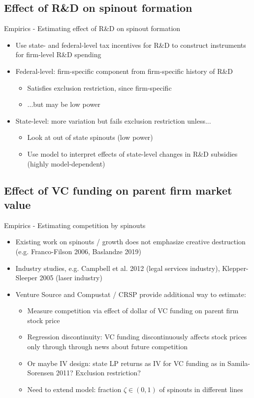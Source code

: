 \documentclass[english,usenames,dvipsnames]{beamer}
\begin{document}
\subsection{Effect of R\&D on spinout formation}

\begin{frame}{Empirics - Estimating effect of R\&D on spinout formation}
\begin{itemize}
	\item Use \alert{state- and federal-level tax incentives for R\&D} to construct \alert{instruments for firm-level R\&D spending}
	\item Federal-level: firm-specific component from firm-specific history of R\&D
	\begin{itemize}
		\item Satisfies exclusion restriction, since firm-specific
		\item ...but may be \alert{low power}
	\end{itemize}
	\item State-level: more variation but fails exclusion restriction unless...
	\begin{itemize}
		\item Look at out of state spinouts (\alert{low power})
		\item Use model to interpret effects of state-level changes in R\&D subsidies (\alert{highly model-dependent})
	\end{itemize}
\end{itemize}
\end{frame}

\subsection{Effect of VC funding on parent firm market value}

\begin{frame}{Empirics - Estimating competition by spinouts}
\begin{itemize}
	\item Existing work on spinouts / growth does not emphasize creative destruction (e.g. Franco-Filson 2006, Baslandze 2019)
	\item Industry studies, e.g. Campbell et al. 2012 (legal services industry), Klepper-Sleeper 2005 (laser industry)
	\item Venture Source and Compustat / CRSP provide additional way to estimate:
	\begin{itemize}
		\item Measure competition \alert{via effect of dollar of VC funding on parent firm stock price}
		\item Regression discontinuity: VC funding discontinuously affects stock prices only through through news about future competition
		\item Or maybe IV design: state LP returns as IV for VC funding as in Samila-Sorensen 2011? Exclusion restriction?
		\item Need to \alert{extend model}: fraction $\zeta \in (0,1)$ of spinouts in different lines
	\end{itemize}
\end{itemize}
\end{frame}
\end{document}
